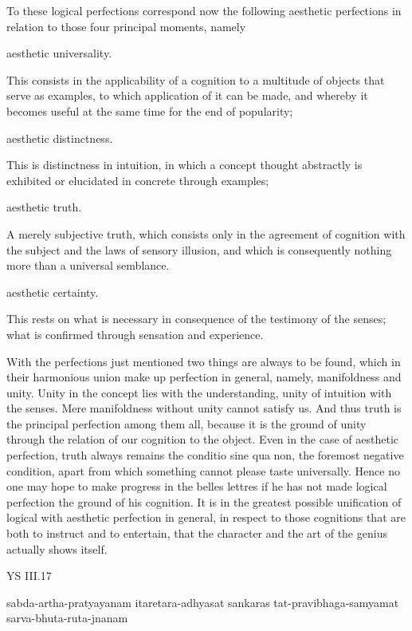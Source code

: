 To these logical perfections correspond now the following aesthetic
perfections in relation to those four principal moments, namely

aesthetic universality.

    This consists in the applicability of a cognition to a
    multitude of objects that serve as examples,
    to which application of it can be made,
    and whereby it becomes useful at the same time for the end of popularity;

aesthetic distinctness.

    This is distinctness in intuition, in which a concept
    thought abstractly is exhibited or elucidated in concrete through examples;

aesthetic truth.

    A merely subjective truth, which consists only in the agreement
    of cognition with the subject and the laws of sensory illusion,
    and which is consequently nothing more than a universal semblance.

aesthetic certainty.

    This rests on what is necessary in consequence of
    the testimony of the senses;
    what is confirmed through sensation and experience.

    With the perfections just mentioned two things are always to be found,
    which in their harmonious union make up perfection in general,
    namely, manifoldness and unity.
    Unity in the concept lies with the understanding,
    unity of intuition with the senses.
    Mere manifoldness without unity cannot satisfy us.
    And thus truth is the principal perfection among them all,
    because it is the ground of unity through
    the relation of our cognition to the object.
    Even in the case of aesthetic perfection,
    truth always remains the conditio sine qua non,
    the foremost negative condition,
    apart from which something cannot please taste universally.
    Hence no one may hope to make progress in the belles lettres
    if he has not made logical perfection the ground of his cognition.
    It is in the greatest possible unification of
    logical with aesthetic perfection in general,
    in respect to those cognitions that are both
    to instruct and to entertain,
    that the character and the art of
    the genius actually shows itself.

YS III.17

    sabda-artha-pratyayanam itaretara-adhyasat sankaras
    tat-pravibhaga-samyamat sarva-bhuta-ruta-jnanam

